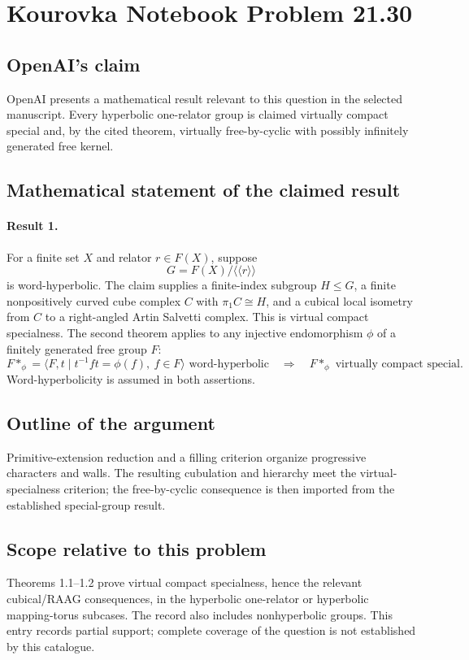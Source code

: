 \documentclass[11pt]{article}
\begin{document}
\section*{Kourovka Notebook Problem 21.30}

\subsection{OpenAI's claim}
OpenAI presents a mathematical result relevant to this question in the selected manuscript. Every hyperbolic one-relator group is claimed virtually compact special and, by the cited theorem, virtually free-by-cyclic with possibly infinitely generated free kernel.

\subsection{Mathematical statement of the claimed result}
\paragraph{Result 1.} For a finite set \(X\) and relator \(r\in F(X)\), suppose
\[
 G=F(X)/\langle\!\langle r\rangle\!\rangle
\]
is word-hyperbolic. The claim supplies a finite-index subgroup \(H\le G\), a finite nonpositively curved cube complex \(C\) with \(\pi_1C\cong H\), and a cubical local isometry from \(C\) to a right-angled Artin Salvetti complex. This is virtual compact specialness. The second theorem applies to any injective endomorphism \(\phi\) of a finitely generated free group \(F\):
\[
 F*_{\phi}=\langle F,t\mid t^{-1}ft=\phi(f),\ f\in F\rangle
 \text{ word-hyperbolic}\quad\Longrightarrow\quad F*_{\phi}\text{ virtually compact special}.
\]
Word-hyperbolicity is assumed in both assertions.

\subsection{Outline of the argument}
Primitive-extension reduction and a filling criterion organize progressive characters and walls. The resulting cubulation and hierarchy meet the virtual-specialness criterion; the free-by-cyclic consequence is then imported from the established special-group result.

\subsection{Scope relative to this problem}
Theorems 1.1–1.2 prove virtual compact specialness, hence the relevant cubical/RAAG consequences, in the hyperbolic one-relator or hyperbolic mapping-torus subcases. The record also includes nonhyperbolic groups. This entry records partial support; complete coverage of the question is not established by this catalogue.
\end{document}

